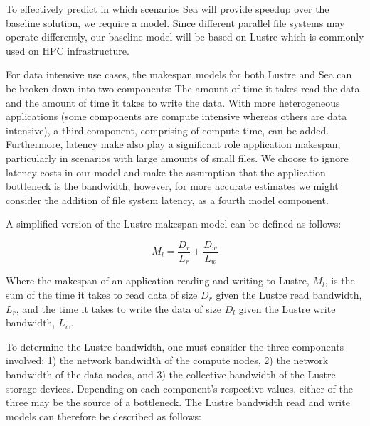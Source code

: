       To effectively predict in which scenarios Sea will provide
      speedup over the baseline solution, we require a model. Since different
      parallel file systems may operate differently, our baseline model will be
      based on Lustre which is commonly used on HPC infrastructure.

      For data intensive use cases, the makespan models for both Lustre and Sea
      can be broken down into two components: The amount of time it takes read
      the data and the amount of time it takes to write the data. With more
      heterogeneous applications (some components are compute intensive whereas
      others are data intensive), a third component, comprising of compute time,
      can be added. Furthermore, latency make also play a significant role
      application makespan, particularly in scenarios with large amounts of
      small files. We choose to ignore latency costs in our model and make the
      assumption that the application bottleneck is the bandwidth, however, for
      more accurate estimates we might consider the addition of file system
      latency, as a fourth model component.

      A simplified version of the Lustre makespan model can be defined as
      follows:

      \begin{equation}\label{eq:lustrenpc}
          M_{l} =  \frac{D_{r}}{L_{r}} + \frac{D_{w}}{L_{w}}
      \end{equation}

      Where the makespan of an application reading and writing to Lustre, $M_{l}$,
      is the sum of the time it takes to read data of size $D_{r}$ given the Lustre
      read bandwidth, $L_{r}$, and the time it takes to write the data of size $D_{l}$
      given the Lustre write bandwidth, $L_{w}$.


      To determine the Lustre bandwidth, one must consider the three components
  involved: 1) the network bandwidth of the compute nodes, 2) the network
  bandwidth of the data nodes, and 3) the collective bandwidth of the Lustre
  storage devices. Depending on each component's respective values, either of
  the three may be the source of a bottleneck. The Lustre bandwidth read and
  write models can therefore be described as follows:

